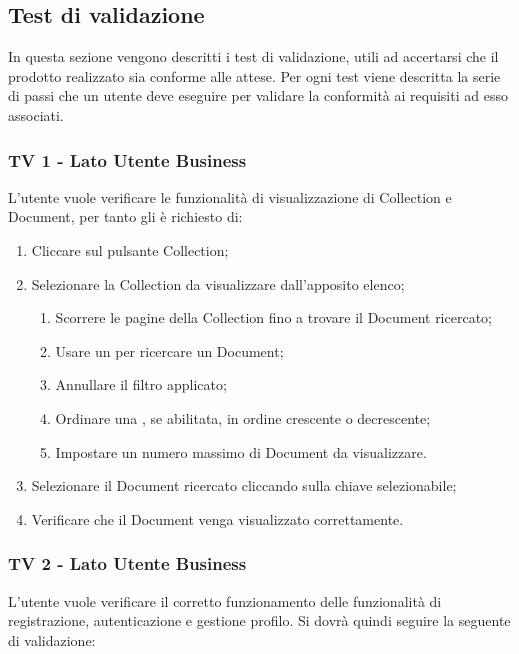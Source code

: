 \subsection{Test di validazione}
In questa sezione vengono descritti i test di validazione, utili ad accertarsi che il prodotto realizzato sia conforme alle attese.
Per ogni test viene descritta la serie di passi che un utente deve eseguire per validare la conformità ai requisiti ad esso associati.

\subsubsection{TV 1 - Lato Utente Business}

L'utente vuole verificare le funzionalità di visualizzazione di Collection e Document, per tanto gli è richiesto di:


\begin{enumerate}
\item Cliccare sul pulsante Collection;
\item Selezionare la Collection da visualizzare dall'apposito elenco;
\begin{enumerate}
\item Scorrere le pagine della Collection fino a trovare il Document ricercato;
\item Usare un  per ricercare un Document;
\item Annullare il filtro applicato;
\item Ordinare una , se abilitata, in ordine crescente o decrescente;
\item Impostare un numero massimo di Document da visualizzare.
\end{enumerate}
\item Selezionare il Document ricercato cliccando sulla chiave selezionabile;
\item Verificare che il Document venga visualizzato correttamente.
\end{enumerate}

\subsubsection{TV 2 - Lato Utente Business}
L'utente vuole verificare il corretto funzionamento delle funzionalità di registrazione, autenticazione e gestione profilo.
Si dovrà quindi seguire la seguente  di validazione:

